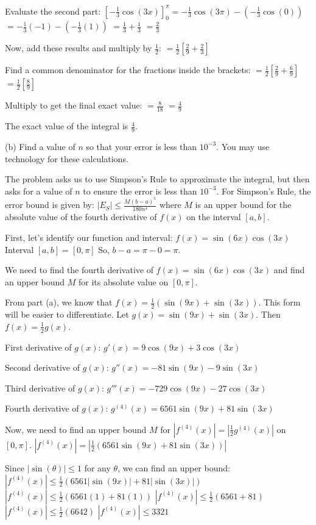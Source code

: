 \documentclass{article}
\begin{document}
Evaluate the second part:
$\left[-\frac{1}{3} \cos(3x)\right]_0^\pi = -\frac{1}{3} \cos(3\pi) - \left(-\frac{1}{3} \cos(0)\right)$
$= -\frac{1}{3}(-1) - \left(-\frac{1}{3}(1)\right)$
$= \frac{1}{3} + \frac{1}{3}$
$= \frac{2}{3}$

Now, add these results and multiply by $\frac{1}{2}$:
$= \frac{1}{2} \left[ \frac{2}{9} + \frac{2}{3} \right]$

Find a common denominator for the fractions inside the brackets:
$= \frac{1}{2} \left[ \frac{2}{9} + \frac{6}{9} \right]$
$= \frac{1}{2} \left[ \frac{8}{9} \right]$

Multiply to get the final exact value:
$= \frac{8}{18}$
$= \frac{4}{9}$

The exact value of the integral is $\frac{4}{9}$.

(b) Find a value of $n$ so that your error is less than $10^{-3}$. You may use technology for these calculations.

The problem asks us to use Simpson's Rule to approximate the integral, but then asks for a value of $n$ to ensure the error is less than $10^{-3}$. For Simpson's Rule, the error bound is given by:
$|E_S| \le \frac{M(b-a)^5}{180n^4}$
where $M$ is an upper bound for the absolute value of the fourth derivative of $f(x)$ on the interval $[a, b]$.

First, let's identify our function and interval:
$f(x) = \sin(6x) \cos(3x)$
Interval $[a, b] = [0, \pi]$
So, $b-a = \pi - 0 = \pi$.

We need to find the fourth derivative of $f(x) = \sin(6x) \cos(3x)$ and find an upper bound $M$ for its absolute value on $[0, \pi]$.

From part (a), we know that $f(x) = \frac{1}{2}(\sin(9x) + \sin(3x))$. This form will be easier to differentiate.
Let $g(x) = \sin(9x) + \sin(3x)$. Then $f(x) = \frac{1}{2}g(x)$.

First derivative of $g(x)$:
$g'(x) = 9\cos(9x) + 3\cos(3x)$

Second derivative of $g(x)$:
$g''(x) = -81\sin(9x) - 9\sin(3x)$

Third derivative of $g(x)$:
$g'''(x) = -729\cos(9x) - 27\cos(3x)$

Fourth derivative of $g(x)$:
$g^{(4)}(x) = 6561\sin(9x) + 81\sin(3x)$

Now, we need to find an upper bound $M$ for $|f^{(4)}(x)| = \left|\frac{1}{2}g^{(4)}(x)\right|$ on $[0, \pi]$.
$|f^{(4)}(x)| = \left|\frac{1}{2}(6561\sin(9x) + 81\sin(3x))\right|$

Since $|\sin(\theta)| \le 1$ for any $\theta$, we can find an upper bound:
$|f^{(4)}(x)| \le \frac{1}{2}(6561|\sin(9x)| + 81|\sin(3x)|)$
$|f^{(4)}(x)| \le \frac{1}{2}(6561(1) + 81(1))$
$|f^{(4)}(x)| \le \frac{1}{2}(6561 + 81)$
$|f^{(4)}(x)| \le \frac{1}{2}(6642)$
$|f^{(4)}(x)| \le 3321$
\end{document}
